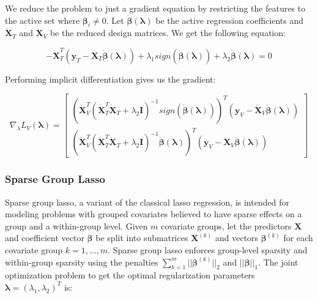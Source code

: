 \documentclass[10pt,letterpaper]{article}
\begin{document}
We reduce the problem to just a gradient equation by restricting the features to the active set where $\boldsymbol \beta_i \ne 0$. Let $\dot{\boldsymbol{\beta}}(\boldsymbol \lambda)$ be the active regression coefficients and $\dot{\boldsymbol{X}}_T$ and $\dot{\boldsymbol{X}}_V$ be the reduced design matrices. We get the following equation:

\begin{equation}
-\dot{\boldsymbol{X}}_T^T(\boldsymbol y_T - \dot{\boldsymbol{X}}_T \dot{\boldsymbol{\beta}} (\boldsymbol{\lambda}) )
+ \lambda_1 sign(\dot{\boldsymbol{\beta}} (\boldsymbol{\lambda}))
+ \lambda_2 \dot{\boldsymbol{\beta}}(\boldsymbol{\lambda}) = 0
\end{equation}

Performing implicit differentiation gives us the gradient:

\begin{equation}
\nabla_\lambda L_V(\boldsymbol{\lambda}) =
\begin{bmatrix}
(\dot{\boldsymbol{X}}_V^T(\dot{\boldsymbol{X}}_T^T \dot{\boldsymbol{X}}_T + \lambda_2 \boldsymbol{I})^{-1}
sign(\dot{\boldsymbol{\beta}} (\boldsymbol{\lambda})))^T
(\boldsymbol y_V - \dot{\boldsymbol{X}}_V \dot{\boldsymbol{\beta}} (\boldsymbol{\lambda}))\\
(\dot{\boldsymbol{X}}_V^T(\dot{\boldsymbol{X}}_T^T \dot{\boldsymbol{X}}_T + \lambda_2 \boldsymbol{I})^{-1} \dot{\boldsymbol{\beta}} (\boldsymbol{\lambda}))^T
(\boldsymbol y_V - \dot{\boldsymbol{X}}_V \dot{\boldsymbol{\beta}} (\boldsymbol{\lambda}))
\end{bmatrix}
\end{equation}

\subsubsection{Sparse Group Lasso}

Sparse group lasso, a variant of the classical lasso regression, is intended for modeling problems with grouped covariates believed to have sparse effects on a group and a within-group level. Given $m$ covariate groups, let the predictors $\boldsymbol{X}$ and coefficient vector $\boldsymbol \beta$ be split into submatrices $\boldsymbol{X}^{(k)}$ and vectors $\boldsymbol \beta^{(k)}$ for each covariate group $k = 1, ... , m$. Sparse group lasso enforces group-level sparsity and within-group sparsity using the penalties $\sum_{k=1}^m \lvert\lvert \boldsymbol\beta^{(k)} \rvert \rvert_2$ and $||\boldsymbol\beta ||_1$. The joint optimization problem to get the optimal regularization parameters $\boldsymbol{\lambda} = (\lambda_1, \lambda_2)^T$ is:
\end{document}
